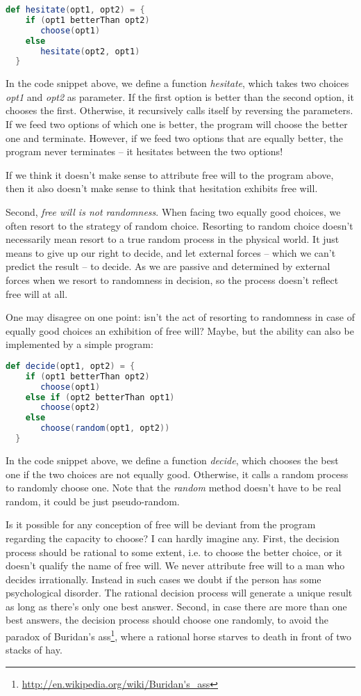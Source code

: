 \begin{lstlisting}[language=Scala]
  def hesitate(opt1, opt2) = {
    if (opt1 betterThan opt2)
       choose(opt1)
    else
       hesitate(opt2, opt1)
  }
\end{lstlisting}

In the code snippet above, we define a function \emph{hesitate}, which takes two choices \emph{opt1} and \emph{opt2} as parameter. If the first option is better than the second option, it chooses the first. Otherwise, it recursively calls itself by reversing the parameters. If we feed two options of which one is better, the program will choose the better one and terminate. However, if we feed two options that are equally better, the program never terminates -- it hesitates between the two options!

If we think it doesn't make sense to attribute free will to the program above, then it also doesn't make sense to think that hesitation exhibits free will.

Second, \emph{free will is not randomness}. When facing two equally good choices, we often resort to the strategy of random choice. Resorting to random choice doesn't necessarily mean resort to a true random process in the physical world. It just means to give up our right to decide, and let external forces -- which we can't predict the result -- to decide. As we are passive and determined by external forces when we resort to randomness in decision, so the process doesn't reflect free will at all.

One may disagree on one point: isn't the act of resorting to randomness in case of equally good choices an exhibition of free will? Maybe, but the ability can also be implemented by a simple program:

\begin{lstlisting}[language=Scala]
  def decide(opt1, opt2) = {
    if (opt1 betterThan opt2)
       choose(opt1)
    else if (opt2 betterThan opt1)
       choose(opt2)
    else
       choose(random(opt1, opt2))
  }
\end{lstlisting}

In the code snippet above, we define a function \emph{decide}, which chooses the best one if the two choices are not equally good. Otherwise, it calls a random process to randomly choose one. Note that the \emph{random} method doesn't have to be real random, it could be just pseudo-random.

Is it possible for any conception of free will be deviant from the program regarding the capacity to choose? I can hardly imagine any. First, the decision process should be rational to some extent, i.e. to choose the better choice, or it doesn't qualify the name of free will. We never attribute free will to a man who decides irrationally. Instead in such cases we doubt if the person has some psychological disorder. The rational decision process will generate a unique result as long as there's only one best answer. Second, in case there are more than one best answers, the decision process should choose one randomly, to avoid the paradox of Buridan's ass\footnote{\url{http://en.wikipedia.org/wiki/Buridan's_ass}}, where a rational horse starves to death in front of two stacks of hay.

